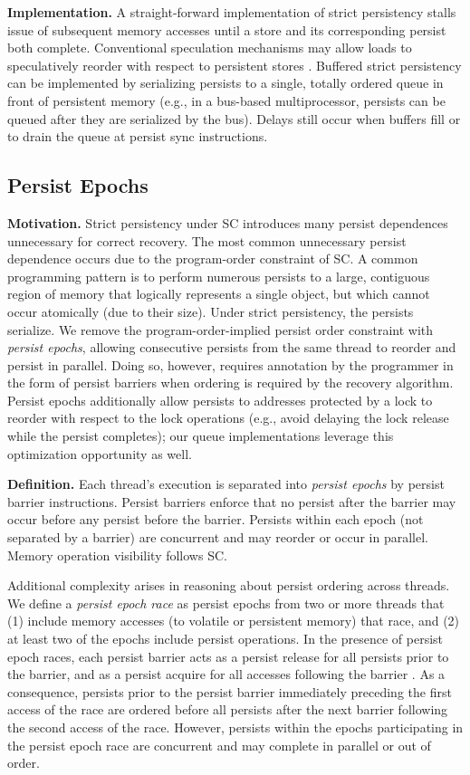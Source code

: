 \textbf{Implementation.}
A straight-forward implementation of strict persistency stalls issue of subsequent memory accesses until a store and its corresponding persist both complete.
Conventional speculation mechanisms may allow loads to speculatively reorder with respect to persistent stores \cite{Gharachorloo91}.
Buffered strict persistency can be implemented by serializing persists to a single, totally ordered queue in front of persistent memory (e.g., in a bus-based multiprocessor, persists can be queued after they are serialized by the bus).
Delays still occur when buffers fill or to drain the queue at persist sync instructions.

\subsection{Persist Epochs}
\label{section:PersistencyModels:PersistEpochs}

\textbf{Motivation.}
Strict persistency under SC introduces many persist dependences unnecessary for correct recovery.
The most common unnecessary persist dependence occurs due to the program-order constraint of SC.
A common programming pattern is to perform numerous persists to a large, contiguous region of memory that logically represents a single object, but which cannot occur atomically (due to their size).
Under strict persistency, the persists serialize.
We remove the program-order-implied persist order constraint with \emph{persist epochs}, allowing consecutive persists from the same thread to reorder and persist in parallel.
Doing so, however, requires annotation by the programmer in the form of persist barriers when ordering is required by the recovery algorithm.
Persist epochs additionally allow persists to addresses protected by a lock to reorder with respect to the lock operations (e.g., avoid delaying the lock release while the persist completes); our queue implementations leverage this optimization opportunity as well.

\textbf{Definition.}
Each thread's execution is separated into \emph{persist epochs} by persist barrier instructions.
Persist barriers enforce that no persist after the barrier may occur before any persist before the barrier.
Persists within each epoch (not separated by a barrier) are concurrent and may reorder or occur in parallel.
Memory operation visibility follows SC.

Additional complexity arises in reasoning about persist ordering across threads. 
We define a \emph{persist epoch race} as persist epochs from two or more threads that (1) include memory accesses (to volatile or persistent memory) that race, and (2) at least two of the epochs include persist operations. 
In the presence of persist epoch races, each persist barrier acts as a persist release for all persists prior to the barrier, and as a persist acquire for all accesses following the barrier \cite{Gharachorloo90}.
As a consequence, persists prior to the persist barrier immediately preceding the first access of the race are ordered before all persists after the next barrier following the second access of the race.
However, persists within the epochs participating in the persist epoch race are concurrent and may complete in parallel or out of order.

